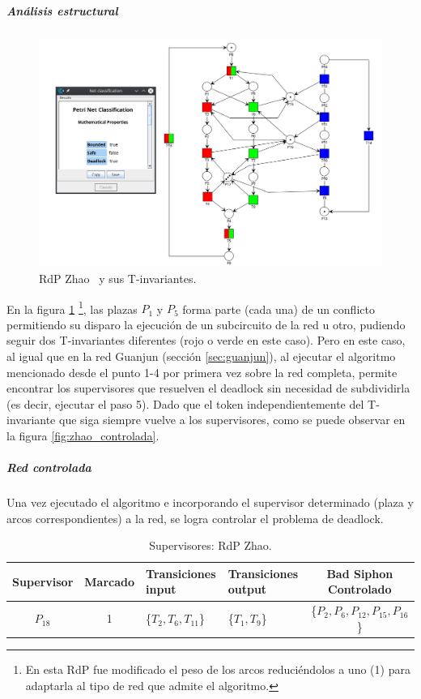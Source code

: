 \subparagraph{Análisis estructural}
\hfill \break
\begin{figure}[H]
	\centering
	\includegraphics[width=\textwidth]{Figures/algoritmo3/Zhao1.png}
	\caption[RdP Zhao y sus T-invariantes.]{RdP Zhao \footnotemark \ y sus T-invariantes.}
	\label{fig:zhao_T-invariantes}
 \end{figure} 
 
En la figura \ref{fig:zhao_T-invariantes} \footnote{En esta RdP fue modificado el peso de los arcos reduciéndolos a uno (1) para adaptarla al tipo de red que admite el algoritmo.}, las plazas $P_1$ y $P_5$ forma parte (cada una) de un conflicto permitiendo su disparo la ejecución de un subcircuito de la red u otro, pudiendo seguir dos T-invariantes diferentes (rojo o verde en este caso). Pero en este caso, al igual que en la red Guanjun (sección \ref{sec:guanjun}), al ejecutar el algoritmo mencionado desde el punto 1-4 por primera vez sobre la red completa, permite encontrar los supervisores que resuelven el deadlock sin necesidad de subdividirla (es decir, ejecutar el paso 5). Dado que el token independientemente del T-invariante que siga siempre vuelve a los supervisores, como se puede observar en la figura \ref{fig:zhao_controlada}.\\

\subparagraph{Red controlada}
\hfill \break
Una vez ejecutado el algoritmo e incorporando el supervisor determinado (plaza y arcos correspondientes) a la red, se logra controlar el problema de deadlock.

\begin{table}[H]
    \centering
    \begin{tabular}{|c|c|P{2.2cm}|P{2.2cm}|c|}
    \hline
    \textbf{Supervisor} & \textbf{Marcado} & \textbf{Transiciones input} & \textbf{Transiciones output} & \textbf{Bad Siphon Controlado}  \\  \hline
    $P_{18}$ & 1 & \{$T_{2}, T_6, T_{11}$\} & \{$T_{1}, T_{9}$\} & \{$P_2, P_{6}, P_{12}, P_{15}, P_{16}$\} \\ 
    \hline
    \end{tabular}
    \caption{Supervisores: RdP Zhao.}
    \label{tab:Zhao-v3}
\end{table}

